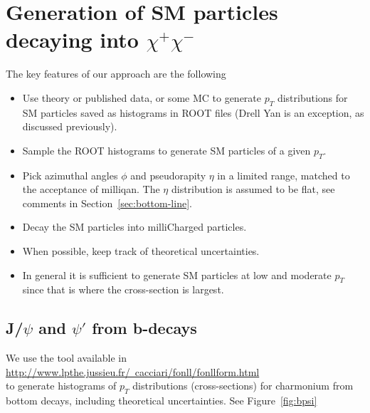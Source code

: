 \documentclass[12pt]{article}
\begin{document}
  \section{Generation of SM particles decaying into $\chi^+ \chi^-$}


  The key features of our approach are the following
\begin{itemize}
\item Use theory or published data, or some MC to generate $p_T$ distributions for SM
  particles
saved as histograms in ROOT files (Drell Yan is an exception, as discussed previously).
\item Sample the ROOT histograms to generate SM particles of a 
given $p_T$.
\item Pick azimuthal angles $\phi$ and pseudorapity $\eta$ in a
  limited 
  range, matched to the acceptance of milliqan.  The $\eta$
  distribution is assumed to be flat, see comments in
  Section~\ref{sec:bottom-line}.
\item Decay the SM particles into milliCharged particles. 
\item When possible, keep track of theoretical uncertainties.
\item In general it is sufficient to generate SM particles at low 
and moderate $p_T$ since that is where the cross-section is largest.
\end{itemize}

\subsection{J/$\psi$ and $\psi'$ from b-decays}
\label{sec:bpsi}
We use the tool available in \\
\href{http://www.lpthe.jussieu.fr/~cacciari/fonll/fonllform.html}
{http://www.lpthe.jussieu.fr/~cacciari/fonll/fonllform.html} \\
to
generate histograms of $p_T$ distributions (cross-sections) for charmonium from 
bottom decays, including theoretical 
uncertainties\cite{Cacciari:2012ny,Cacciari:2015fta}.  
See Figure~\ref{fig:bpsi} 
\end{document}
